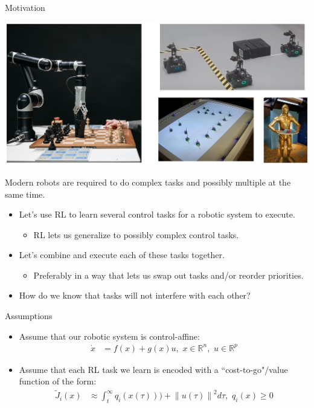 \begin{frame}{Motivation}
	\begin{minipage}{\textwidth}
		\centering		
		\includegraphics[width=0.85\linewidth]{motivationsCombined}
	\end{minipage}%
	\seprule
	Modern robots are required to do complex tasks and possibly multiple at the same time.
\end{frame}

\begin{frame}
	\begin{itemize}
		\item{Let's use RL to learn several control tasks for a robotic system to execute.}
			\begin{itemize}
				\item{ RL lets us generalize to possibly complex control tasks.}
			\end{itemize}
		\item{Let's combine and execute each of these tasks together.}
			\begin{itemize}
				\item{Preferably in a way that lets us swap out tasks and/or reorder priorities.}
			\end{itemize}
		\item{ { \color{red} How do we know that tasks will not interfere with each other? } }
	\end{itemize}
\end{frame}

\begin{frame}{Assumptions}
	\begin{itemize}
		\item{Assume that our robotic system is control-affine:
	\begin{align*}
		\dot{x} &= f(x) + g(x)u, \,\, x \in \mathbb{R}^n, \,\, u \in \mathbb{R}^p
	\end{align*}}
		\item{Assume that each RL task we learn is encoded with a ``cost-to-go"/value function of the form:
	\begin{align*}
		\tilde{J}_i (x) &\approx \int_t^{\infty} q_i(x(\tau))) + {\lVert u(\tau) \rVert}^2 d \tau, \,\, q_i(x) \ge 0
	\end{align*}}
	\end{itemize}
\end{frame}

